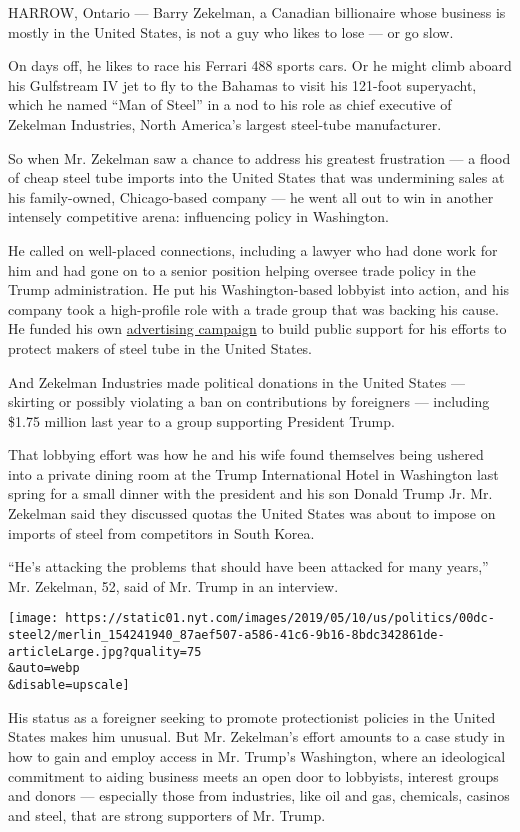 HARROW, Ontario --- Barry Zekelman, a Canadian billionaire whose
business is mostly in the United States, is not a guy who likes to lose
--- or go slow.

On days off, he likes to race his Ferrari 488 sports cars. Or he might
climb aboard his Gulfstream IV jet to fly to the Bahamas to visit his
121-foot superyacht, which he named ``Man of Steel'' in a nod to his
role as chief executive of Zekelman Industries, North America's largest
steel-tube manufacturer.

So when Mr. Zekelman saw a chance to address his greatest frustration
--- a flood of cheap steel tube imports into the United States that was
undermining sales at his family-owned, Chicago-based company --- he went
all out to win in another intensely competitive arena: influencing
policy in Washington.

He called on well-placed connections, including a lawyer who had done
work for him and had gone on to a senior position helping oversee trade
policy in the Trump administration. He put his Washington-based lobbyist
into action, and his company took a high-profile role with a trade group
that was backing his cause. He funded his own
\href{https://www.youtube.com/watch?v=DXuG8tvi2W4}{advertising campaign}
to build public support for his efforts to protect makers of steel tube
in the United States.

And Zekelman Industries made political donations in the United States
--- skirting or possibly violating a ban on contributions by foreigners
--- including \$1.75 million last year to a group supporting President
Trump.

That lobbying effort was how he and his wife found themselves being
ushered into a private dining room at the Trump International Hotel in
Washington last spring for a small dinner with the president and his son
Donald Trump Jr. Mr. Zekelman said they discussed quotas the United
States was about to impose on imports of steel from competitors in South
Korea.

``He's attacking the problems that should have been attacked for many
years,'' Mr. Zekelman, 52, said of Mr. Trump in an interview.

\texttt{[image: https://static01.nyt.com/images/2019/05/10/us/politics/00dc-steel2/merlin\_154241940\_87aef507-a586-41c6-9b16-8bdc342861de-articleLarge.jpg?quality=75\\\&auto=webp\\\&disable=upscale]}

His status as a foreigner seeking to promote protectionist policies in
the United States makes him unusual. But Mr. Zekelman's effort amounts
to a case study in how to gain and employ access in Mr. Trump's
Washington, where an ideological commitment to aiding business meets an
open door to lobbyists, interest groups and donors --- especially those
from industries, like oil and gas, chemicals, casinos and steel, that
are strong supporters of Mr. Trump.

